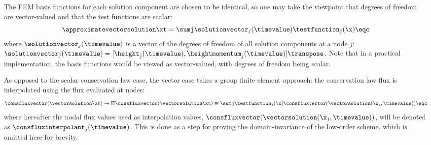 The FEM basis functions for each solution component are chosen to be identical,
so one may take the viewpoint that degrees of freedom are vector-valued
and that the test functions are scalar:
\begin{equation}
  \approximatevectorsolution\xt = \sumj \solutionvector_j(\timevalue)
  \testfunction_j(\x) \eqc
\end{equation}
where $\solutionvector_j(\timevalue)$ is a vector of the degrees of freedom of all
solution components at a node $j$:
$\solutionvector_j(\timevalue)=[\height_j(\timevalue),
\heightmomentum_j(\timevalue)]\transpose$. Note that in a practical
implementation, the basis functions would be viewed as vector-valued, with
degrees of freedom being scalar.

As opposed to the scalar conservation law case, the vector case takes a
group finite element approach: the conservation law flux is interpolated
using the flux evaluated at nodes:
\begin{equation}
  \consfluxvector(\vectorsolution\xt) \rightarrow
  \Pi\consfluxvector(\vectorsolution\xt) 
    \equiv \sumj\testfunction_j(\x)\consfluxvector
      (\vectorsolution(\x_j,\timevalue))
  \eqc
\end{equation}
where hereafter the nodal flux values used as interpolation values,
$\consfluxvector(\vectorsolution(\x_j,\timevalue))$,
will be denoted as $\consfluxinterpolant_j(\timevalue)$. This is done
as a step for proving the domain-invariance of the low-order scheme,
which is omitted here for brevity.

